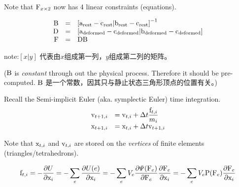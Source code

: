 \documentclass[11pt]{article}
\begin{document}
Note that \({\rm F}_{x\times 2}\) now has 4 linear constraints
(equations).

\begin{equation*}
 \begin{array}{rcl}
 {\rm B}&=&{\rm [a_{rest}-c_{rest}|b_{rest}-c_{rest}]}^{-1} \\
 {\rm D}&=&{\rm [a_{deformed}-c_{deformed}|b_{deformed}-c_{deformed}]} \\
 {\rm F}&=&{\rm DB}
 \end{array}
 \end{equation*}

note:\([x|y]\) 代表由\(x\)组成第一列，\(y\)组成第二列的矩阵。

(\(\rm B\) is \emph{constant} through out the physical process.
Therefore it should be pre-computed. \(\rm B\)
是一个常数，因其只与静止状态三角形顶点的位置有关。)

Recall the Semi-implicit Euler (aka. symplectic Euler) time integration.
\begin{equation*}
\begin{array}{rl}
    {\rm v}_ {t+1,i} &= {\rm v}_ {t,i}+\Delta t\displaystyle\frac{{\rm f}_ {t,i}}{m_{i}} \\
    {\rm x}_ {t+1,i} &= {\rm x}_ {t,i}+\Delta t{\rm v}_{t+1,i}
\end{array}
\end{equation*}

Note that \({\rm x}_{t,i}\) and \({\rm v}_{t,i}\) are stored on the
\emph{vertices} of finite elements (triangles/tetrahedrons).

\begin{equation*}
{\rm f}_{t,i}=-\displaystyle\frac{\partial U}{\partial {\rm x}_{i}}
             =-\sum_{e}\frac{\partial U(e)}{\partial {\rm x}_{i}}
             =-\sum_{e}V_{e}\frac{\partial\varPsi({\rm F}_{e})}{\partial{\rm F}_{e}}\frac{\partial{\rm F}_{e}}{\partial {\rm x}_{i}}
             =-\sum_{e}V_{e}{\rm P}({\rm F}_{e})\frac{\partial {\rm F}_{e}}{\partial {\rm x}_{i}}
\end{equation*}
\end{document}
